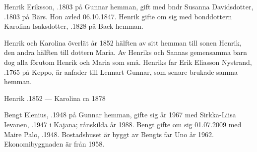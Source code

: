 Henrik Eriksson, .1803 på Gunnar hemman, gift med bndr Susanna Davidsdotter, .1803 på Bärs. Hon avled 06.10.1847. Henrik gifte om sig med bonddottern Karolina Isaksdotter, .1828 på Back hemman.
\begin{jhchildren}
  \item {}
  \item {}
  \item {}
  \item {}
  \item {}
  \item {}
  \item {}
  \item {}
  \item {}
\end{jhchildren}

Henrik och Karolina överlät år 1852 hälften av sitt hemman till sonen Henrik, den andra hälften till dottern Maria. Av Henriks och Sannas gemensamma barn dog alla förutom Henrik och Maria som små. Henriks far Erik Eliasson Nystrand, .1765 på Keppo, är anfader till Lennart Gunnar, som senare brukade samma hemman.

Henrik .1852  ---  Karolina \textdied ca 1878






Bengt Elenius, .1948 på Gunnar hemman, gifte sig år 1967 med Sirkka-Liisa Ievanen, .1947 i Kajana; rånskilda år 1988. Bengt gifte om sig 01.07.2009 med Maire Palo, .1948. Bostadshuset är byggt av Bengts far Uno år 1962. Ekonomibyggnaden är från 1958.
\begin{jhchildren}
  \item {}
  \item {}
  \item {}
\end{jhchildren}

